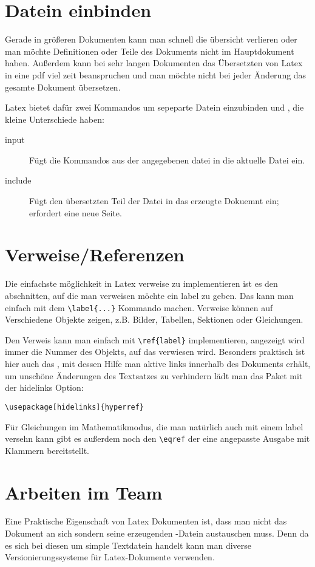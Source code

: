 \section{Datein einbinden}
Gerade in größeren Dokumenten kann man schnell die übersicht verlieren oder man möchte Definitionen oder
Teile des Dokuments nicht im Hauptdokument haben. Außerdem kann bei sehr langen Dokumenten das Übersetzten
von Latex in eine pdf viel zeit beanspruchen und man möchte nicht bei jeder Änderung das gesamte Dokument
übersetzen. 

Latex bietet dafür zwei Kommandos um sepeparte Datein einzubinden \verb++ und \verb++,
die kleine Unterschiede haben:
\begin{description}
  \item[input] Fügt die Kommandos aus der angegebenen datei in die aktuelle Datei ein.
  \item[include] Fügt den übersetzten Teil der Datei in das erzeugte Dokuemnt ein; erfordert eine neue
    Seite. 
\end{description}

\section{Verweise/Referenzen}
Die einfachste möglichkeit in Latex verweise zu implementieren ist es den abschnitten, auf die man verweisen
möchte ein label zu geben. Das kann man einfach mit dem \verb+\label{...}+ Kommando machen. Verweise können auf
Verschiedene Objekte zeigen, z.B. Bilder, Tabellen, Sektionen oder Gleichungen.

Den Verweis kann man einfach mit \verb+\ref{label}+ implementieren, angezeigt wird immer die Nummer des Objekts,
auf das verwiesen wird. Besonders praktisch ist hier auch das , mit dessen Hilfe man aktive
links innerhalb des Dokuments erhält, um unschöne Änderungen des Textsatzes zu verhindern lädt man das Paket mit
der hidelinks Option:
\begin{verbatim}
\usepackage[hidelinks]{hyperref}
\end{verbatim}

Für Gleichungen im Mathematikmodus, die man natürlich auch mit einem label versehn kann gibt es außerdem noch
den \verb+\eqref+ der eine angepasste Ausgabe mit Klammern bereitstellt. 

\section{Arbeiten im Team}
Eine Praktische Eigenschaft von Latex Dokumenten ist, dass man nicht das Dokument an sich sondern seine erzeugenden
-Datein austauschen muss. Denn da es sich bei diesen um simple Textdatein handelt kann man diverse
Versionierungssysteme für Latex-Dokumente verwenden. 

